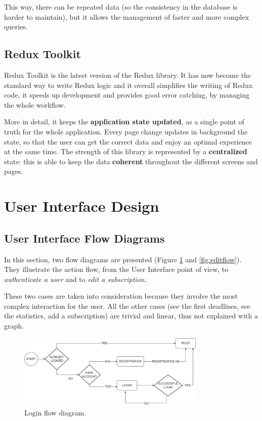 \documentclass[12pt]{article}
\begin{document}
This way, there can be repeated data (so the consistency in the database is harder to maintain), but it allows the management of faster and more complex queries.


\subsection{Redux Toolkit}
Redux Toolkit is the latest version of the Redux library. It has now become the standard way to write Redux logic and it overall simplifies the writing of Redux code, it speeds up development and provides good error catching, by managing the whole workflow.

More in detail, it keeps the \textbf{application state updated}, as a single point of truth for the whole application. Every page change updates in background the state, so that the user can get the correct data and enjoy an optimal experience at the same time. The strength of this library is represented by a \textbf{centralized} state: this is able to keep the data \textbf{coherent} throughout the different screens and pages.


\newpage
\section{User Interface Design}\label{sec:ui}

\subsection{User Interface Flow Diagrams}
In this section, two flow diagrams are presented (Figure \ref{fig:loginflow} and \ref{fig:editflow}). They illustrate the action flow, from the User Interface point of view, to \textit{authenticate a user} and to \textit{edit a subscription}.

These two cases are taken into consideration because they involve the most complex interaction for the user. All the other cases (see the first deadlines, see the statistics, add a subscription) are trivial and linear, thus not explained with a graph.

\begin{figure}[h!]
    \begin{center}
        \includegraphics[width=0.8\textwidth, clip]{../../assets/loginFlow.png}
    \end{center}
    \caption{Login flow diagram.}
    \label{fig:loginflow}
\end{figure}
\end{document}
